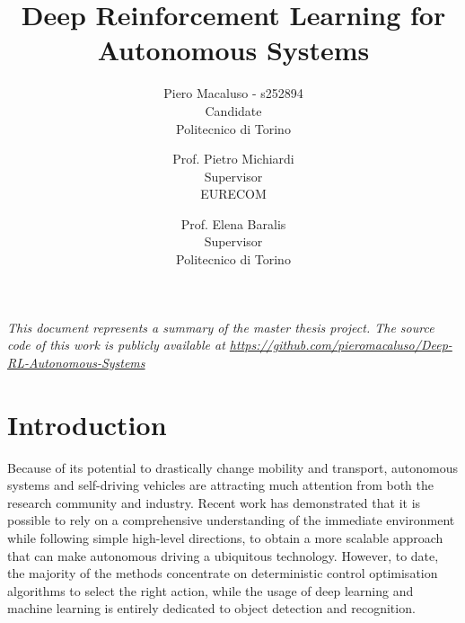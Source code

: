 \documentclass[10pt,twocolumn,letterpaper]{article}
\begin{document}
\title{Deep Reinforcement Learning for Autonomous Systems}

\author{Piero Macaluso - s252894\\
    Candidate\\
    Politecnico di Torino\\
    \and
    Prof. Pietro Michiardi\\
    Supervisor\\
    EURECOM\\
    \and
    Prof. Elena Baralis\\
    Supervisor\\
    Politecnico di Torino\\
}

\maketitle


\textit{This document represents a summary of the master thesis project.
    The source code of this work is publicly available at \url{https://github.com/pieromacaluso/Deep-RL-Autonomous-Systems}}
\section{Introduction}

Because of its potential to drastically change mobility and transport, autonomous systems and self-driving vehicles are attracting much attention from both the research community and industry.
Recent work has demonstrated that it is possible to rely on a comprehensive understanding of the immediate environment while following simple high-level directions, to obtain a more scalable approach that can make autonomous driving a ubiquitous technology.
However, to date, the majority of the methods concentrate on deterministic control optimisation algorithms to select the right action, while the usage of deep learning and machine learning is entirely dedicated to object detection and recognition.
\end{document}
